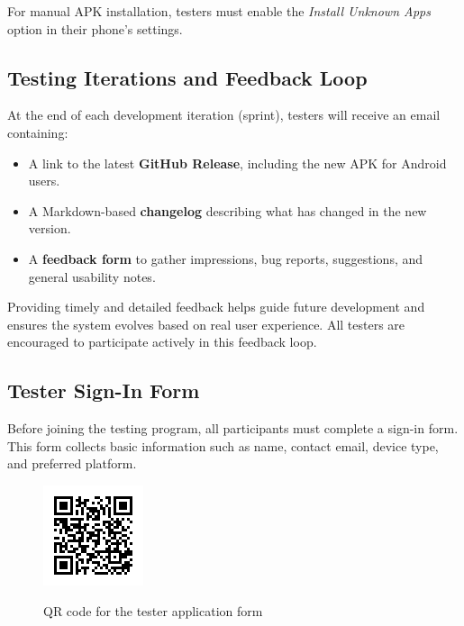 \documentclass[a4paper, 12pt]{article}
\begin{document}
    For manual APK installation, testers must enable the \textit{Install Unknown Apps} option in their phone's settings.

    \newpage
    \subsection{Testing Iterations and Feedback Loop}

    At the end of each development iteration (sprint), testers will receive an email containing:

    \begin{itemize}
      \item A link to the latest \textbf{GitHub Release}, including the new APK for Android users.
      \item A Markdown-based \textbf{changelog} describing what has changed in the new version.
      \item A \textbf{feedback form} to gather impressions, bug reports, suggestions, and general usability notes.
    \end{itemize}

    Providing timely and detailed feedback helps guide future development and ensures the system evolves based on real user experience. All testers are encouraged to participate actively in this feedback loop.

  \subsection*{Tester Sign-In Form}

    Before joining the testing program, all participants must complete a sign-in form. This form collects basic information such as name, contact email, device type, and preferred platform.

    \begin{figure}[h]
      \centering
      \href{https://forms.gle/9WeMwiAdU6G2rrWs5}{\includegraphics[width=0.35\linewidth]{tester_application_form.png}}
      \caption{QR code for the tester application form}
    \end{figure}
\end{document}
